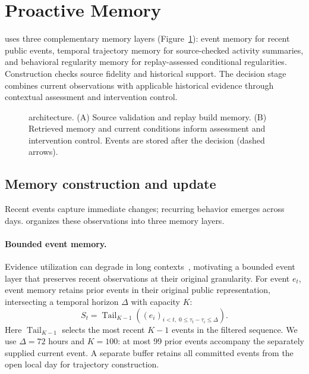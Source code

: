 \section{Proactive Memory}
\label{sec:framework}

\system{} uses three complementary memory layers (Figure~\ref{fig:architecture}): event memory for recent public events, temporal trajectory memory for source-checked activity summaries, and behavioral regularity memory for replay-assessed conditional regularities.
Construction checks source fidelity and historical support.
The decision stage combines current observations with applicable historical evidence through contextual assessment and intervention control.

\begin{figure}[t]
    \centering
    \makebox[\textwidth][c]{\resizebox{0.98\textwidth}{!}{}}
    \caption{\system{} architecture. (A) Source validation and replay build memory. (B) Retrieved memory and current conditions inform assessment and intervention control. Events are stored after the decision (dashed arrows).}
    \label{fig:architecture}
\end{figure}

\subsection{Memory construction and update}

Recent events capture immediate changes; recurring behavior emerges across days.
\system{} organizes these observations into three memory layers.

\paragraph{Bounded event memory.}
Evidence utilization can degrade in long contexts~\citep{liu2024lost}, motivating a bounded event layer that preserves recent observations at their original granularity.
For event $e_t$, event memory retains prior events in their original public representation, intersecting a temporal horizon $\Delta$ with capacity $K$:
\begin{equation}
S_t=\operatorname{Tail}_{K-1}
\left((e_i)_{i<t,\;0\leq\tau_t-\tau_i\leq\Delta}\right).
\label{eq:source_memory}
\end{equation}
Here $\operatorname{Tail}_{K-1}$ selects the most recent $K-1$ events in the filtered sequence.
We use $\Delta=72$ hours and $K=100$: at most 99 prior events accompany the separately supplied current event.
A separate buffer retains all committed events from the open local day for trajectory construction.

